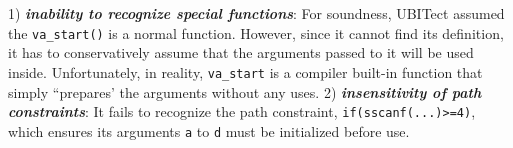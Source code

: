 1) \textbf{\textit{inability to recognize special functions}}: 
For soundness, UBITect assumed the \texttt{va\_start()} is a normal function. However, since it cannot find its definition, it has to conservatively assume that the arguments passed to it will be used inside.
Unfortunately, in reality, \texttt{va\_start} is a compiler built-in function that simply ``prepares' the arguments without any uses.
2) \textbf{\textit{insensitivity of path constraints}}: 
It fails to recognize the path constraint, \ie \texttt{if(sscanf(...)>=4)}, which ensures its arguments \texttt{a} to \texttt{d} must be initialized before use. 









% 

